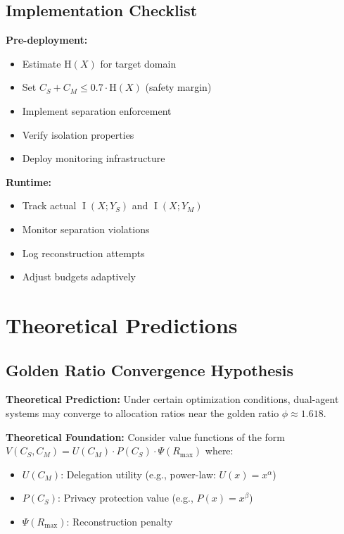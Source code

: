 \documentclass[11pt,a4paper]{article}
\theoremstyle{definition}
\DeclareMathOperator{\I}{I}
\newcommand{\Entropy}{\mathrm{H}}
\begin{document}
\subsection{Implementation Checklist}

\textbf{Pre-deployment:}

\begin{itemize}
    \item[$\square$] Estimate $\Entropy(X)$ for target domain
    \item[$\square$] Set $C_S + C_M \leq 0.7 \cdot \Entropy(X)$ (safety margin)
    \item[$\square$] Implement separation enforcement
    \item[$\square$] Verify isolation properties
    \item[$\square$] Deploy monitoring infrastructure
\end{itemize}

\textbf{Runtime:}

\begin{itemize}
    \item[$\square$] Track actual $\I(X; Y_S)$ and $\I(X; Y_M)$
    \item[$\square$] Monitor separation violations
    \item[$\square$] Log reconstruction attempts
    \item[$\square$] Adjust budgets adaptively
\end{itemize}

\section{Theoretical Predictions}

\subsection{Golden Ratio Convergence Hypothesis}

\textbf{Theoretical Prediction:} Under certain optimization conditions, dual-agent systems may converge to allocation ratios near the golden ratio $\phi \approx 1.618$.

\textbf{Theoretical Foundation:} Consider value functions of the form $V(C_S, C_M) = U(C_M) \cdot P(C_S) \cdot \Psi(R_{\max})$ where:

\begin{itemize}
    \item $U(C_M)$: Delegation utility (e.g., power-law: $U(x) = x^\alpha$)
    \item $P(C_S)$: Privacy protection value (e.g., $P(x) = x^\beta$)
    \item $\Psi(R_{\max})$: Reconstruction penalty
\end{itemize}
\end{document}
